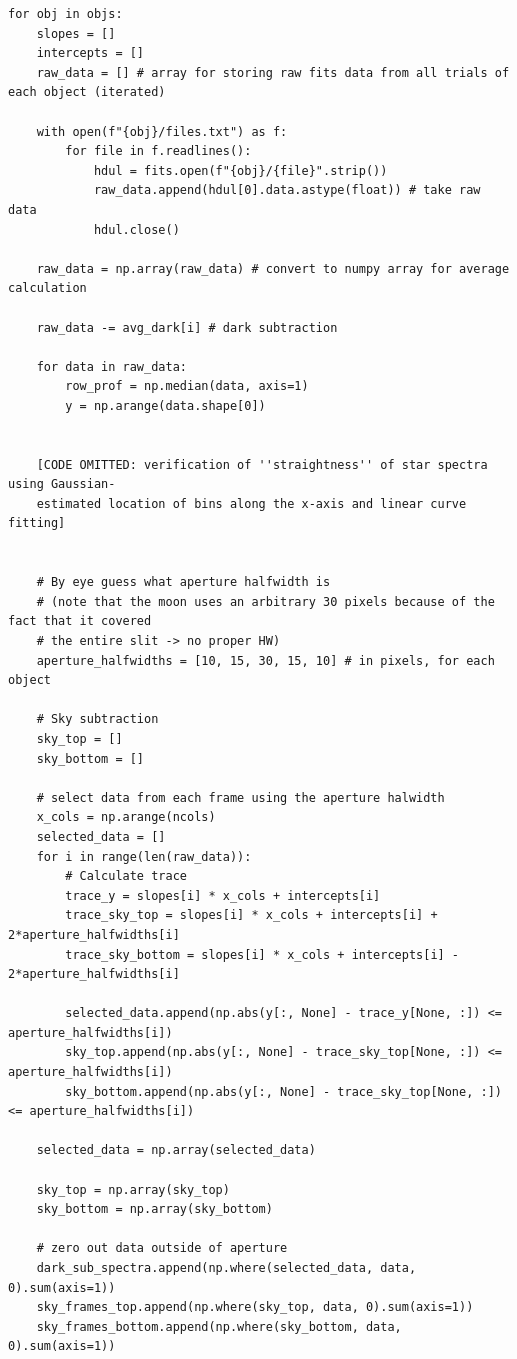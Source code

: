 \documentclass[twocolumn]{aastex702}
\begin{document}
		\begin{verbatim}
for obj in objs:
    slopes = []
    intercepts = []
    raw_data = [] # array for storing raw fits data from all trials of each object (iterated)
    
    with open(f"{obj}/files.txt") as f:
        for file in f.readlines():
            hdul = fits.open(f"{obj}/{file}".strip())
            raw_data.append(hdul[0].data.astype(float)) # take raw data
            hdul.close()
    
    raw_data = np.array(raw_data) # convert to numpy array for average calculation
    
    raw_data -= avg_dark[i] # dark subtraction

    for data in raw_data:
        row_prof = np.median(data, axis=1)
        y = np.arange(data.shape[0])


    [CODE OMITTED: verification of ''straightness'' of star spectra using Gaussian-
    estimated location of bins along the x-axis and linear curve fitting]

        
    # By eye guess what aperture halfwidth is
    # (note that the moon uses an arbitrary 30 pixels because of the fact that it covered 
    # the entire slit -> no proper HW)
    aperture_halfwidths = [10, 15, 30, 15, 10] # in pixels, for each object

    # Sky subtraction
    sky_top = []
    sky_bottom = []
    
    # select data from each frame using the aperture halwidth
    x_cols = np.arange(ncols)
    selected_data = []
    for i in range(len(raw_data)):
        # Calculate trace 
        trace_y = slopes[i] * x_cols + intercepts[i]
        trace_sky_top = slopes[i] * x_cols + intercepts[i] + 2*aperture_halfwidths[i]
        trace_sky_bottom = slopes[i] * x_cols + intercepts[i] - 2*aperture_halfwidths[i]
        
        selected_data.append(np.abs(y[:, None] - trace_y[None, :]) <= aperture_halfwidths[i])
        sky_top.append(np.abs(y[:, None] - trace_sky_top[None, :]) <= aperture_halfwidths[i])
        sky_bottom.append(np.abs(y[:, None] - trace_sky_top[None, :]) <= aperture_halfwidths[i])

    selected_data = np.array(selected_data)
    
    sky_top = np.array(sky_top)
    sky_bottom = np.array(sky_bottom)
    
    # zero out data outside of aperture
    dark_sub_spectra.append(np.where(selected_data, data, 0).sum(axis=1))
    sky_frames_top.append(np.where(sky_top, data, 0).sum(axis=1))
    sky_frames_bottom.append(np.where(sky_bottom, data, 0).sum(axis=1))
    

\end{verbatim}
\end{document}
